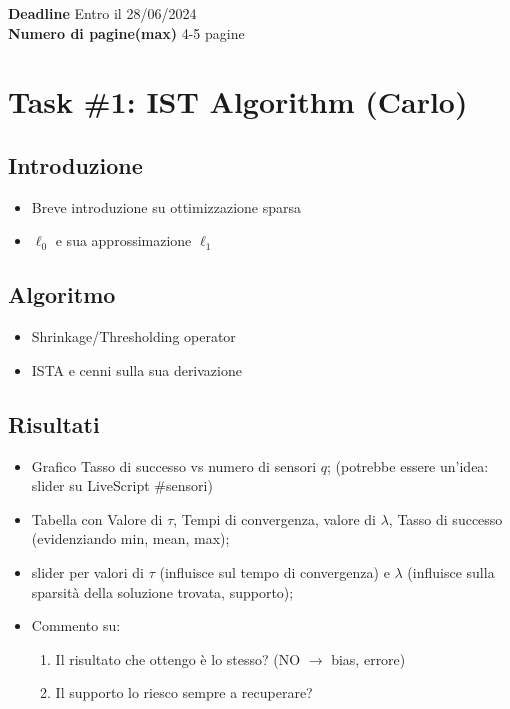 \noindent
\textbf{Deadline}
    {\color{red}Entro il 28/06/2024}\\
\noindent
\textbf{Numero di pagine(max)}  4-5 pagine

\section*{Task \#1: IST Algorithm (Carlo)}
\subsection*{Introduzione}
\begin{itemize}
    \itemsep0em
    \item Breve introduzione su ottimizzazione sparsa
    \item $\ell_0$ e sua approssimazione $\ell_1$ 
\end{itemize}
\subsection*{Algoritmo}
\begin{itemize}
    \itemsep0em
    \item Shrinkage/Thresholding operator
    \item ISTA e cenni sulla sua derivazione
\end{itemize}
\subsection*{Risultati}
\begin{itemize}
    \item Grafico Tasso di successo vs numero di sensori $q$; (potrebbe essere un'idea: slider su LiveScript \#sensori)
    \item Tabella con Valore di $\tau$, Tempi di convergenza, valore di $\lambda$, Tasso di successo (evidenziando min, mean, max);
    \item slider per valori di $\tau$ (influisce sul tempo di convergenza) e $\lambda$ (influisce sulla sparsità della soluzione trovata, supporto);
    \item Commento su: 
    \begin{enumerate}
        \item Il risultato che ottengo \`e lo stesso? (NO $\to$ bias, errore)
        \item Il supporto lo riesco sempre a recuperare?
    \end{enumerate}
\end{itemize}


